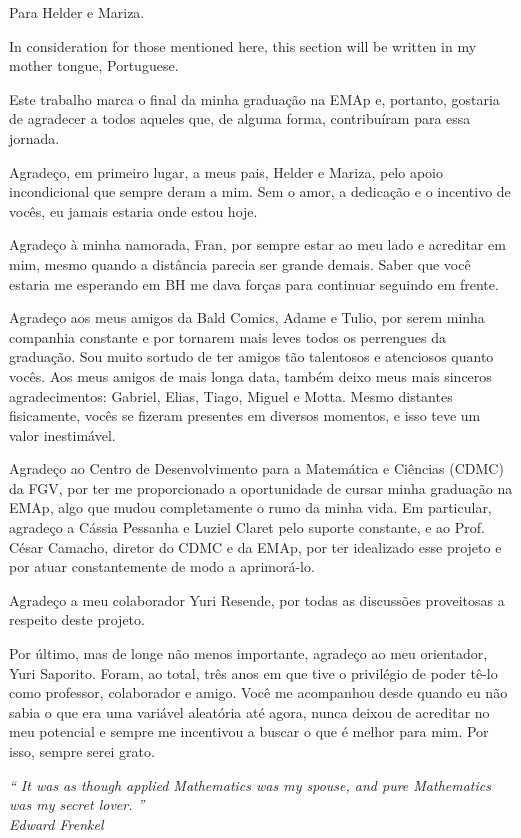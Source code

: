 \newpage

\begin{dedicatoria}
    \vspace*{\fill}
    \hfill
    \begin{minipage}{.6\textwidth}
        Para Helder e Mariza.
    \end{minipage}
\end{dedicatoria}
 
\begin{agradecimentos}
    In consideration for those mentioned here, this section will be written in my mother tongue, Portuguese.

    Este trabalho marca o final da minha graduação na EMAp e, portanto, gostaria de agradecer a todos aqueles que, de alguma forma, contribuíram para essa jornada.

    Agradeço, em primeiro lugar, a meus pais, Helder e Mariza, pelo apoio incondicional que sempre deram a mim.
    Sem o amor, a dedicação e o incentivo de vocês, eu jamais estaria onde estou hoje.
    
    Agradeço à minha namorada, Fran, por sempre estar ao meu lado e acreditar em mim, mesmo quando a distância parecia ser grande demais.
    Saber que você estaria me esperando em BH me dava forças para continuar seguindo em frente.

    Agradeço aos meus amigos da Bald Comics, Adame e Tulio, por serem minha companhia constante e por tornarem mais leves todos os perrengues da graduação.
    Sou muito sortudo de ter amigos tão talentosos e atenciosos quanto vocês.
    Aos meus amigos de mais longa data, também deixo meus mais sinceros agradecimentos: Gabriel, Elias, Tiago, Miguel e Motta.
    Mesmo distantes fisicamente, vocês se fizeram presentes em diversos momentos, e isso teve um valor inestimável.

    Agradeço ao Centro de Desenvolvimento para a Matemática e Ciências (CDMC) da FGV, por ter me proporcionado a oportunidade de cursar minha graduação na EMAp, algo que mudou completamente o rumo da minha vida.
    Em particular, agradeço a Cássia Pessanha e Luziel Claret pelo suporte constante, e ao Prof. César Camacho, diretor do CDMC e da EMAp, por ter idealizado esse projeto e por atuar constantemente de modo a aprimorá-lo.

    Agradeço a meu colaborador Yuri Resende, por todas as discussões proveitosas a respeito deste projeto.

    Por último, mas de longe não menos importante, agradeço ao meu orientador, Yuri Saporito.
    Foram, ao total, três anos em que tive o privilégio de poder tê-lo como professor, colaborador e amigo.
    Você me acompanhou desde quando eu não sabia o que era uma variável aleatória até agora, nunca deixou de acreditar no meu potencial e sempre me incentivou a buscar o que é melhor para mim.
    Por isso, sempre serei grato.
\end{agradecimentos}

\begin{epigrafe}
\vspace*{\fill}

\begin{flushright}
    \hspace{7.5cm}
    \textit{
        ``
        It was as though applied Mathematics was my spouse, and pure Mathematics was my secret lover.
        ''
    } \\
        \textit{Edward Frenkel}
\end{flushright}
\end{epigrafe}
